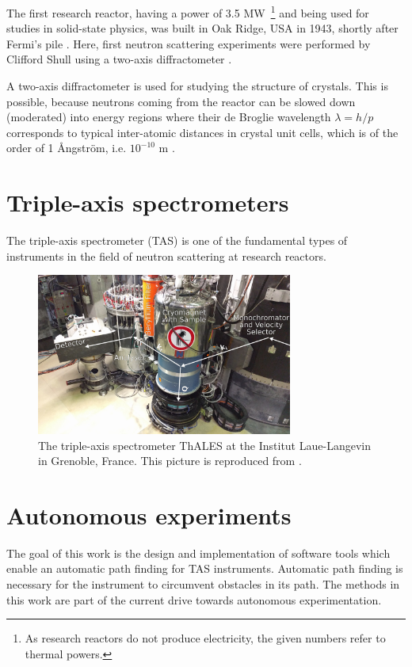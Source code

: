 The first research reactor, having a power of 3.5 MW~\footnote{As research reactors do not produce electricity, the given numbers refer to thermal powers.} and being used for studies in solid-state physics, was built in Oak Ridge, USA in 1943, shortly after Fermi's pile \cite[p.3]{Jacrot2021}. 
Here, first neutron scattering experiments were performed by Clifford Shull using a two-axis diffractometer \cite[p.3]{Jacrot2021}.

A two-axis diffractometer is used for studying the structure of crystals. This is possible, because neutrons coming from the reactor can be slowed down (moderated) into energy regions where their de Broglie wavelength $\lambda = h/p$ corresponds to typical inter-atomic distances in crystal unit cells, which is of the order of 1 \AA{}ngstr\"om, i.e. $10^{-10}$ m \cite[pp.1,3]{Squires2012}.



\section{Triple-axis spectrometers \label{sec:tas}}

The triple-axis spectrometer (TAS) is one of the fundamental types of instruments in the field of neutron scattering at research reactors.

\clearpage
\begin{figure}[htb]
	\centering
	\includegraphics[width=0.75\textwidth]{figures/thales.jpg}
	\caption{The triple-axis spectrometer ThALES \cite{thales} at the Institut Laue-Langevin in Grenoble, France. This picture is reproduced from \cite{TODO}.}
	\label{fig:thales}
\end{figure}



\section{Autonomous experiments \label{sec:autonomous}}

The goal of this work is the design and implementation of software tools which enable an automatic path finding for TAS instruments.
Automatic path finding is necessary for the instrument to circumvent obstacles in its path. The methods in this work are part of the current drive towards autonomous experimentation.
